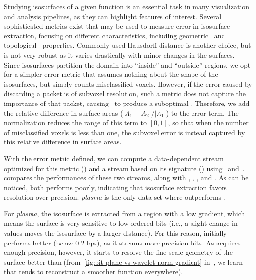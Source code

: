 Studying isosurfaces of a given function is an essential task in many visualization and analysis
pipelines, as they can highlight features of interest. Several sophisticated metrics exist that may
be used to measure error in isosurface extraction, focusing on different characteristics, including
geometric~\cite{verifiable-isosurface} and topological~\cite{topology-verification-isosurface}
properties. Commonly used Hausdorff distance is another choice, but is not very robust as it varies
drastically with minor changes in the surfaces. Since isosurfaces partition the domain into
``inside'' and ``outside'' regions, we opt for a simpler error metric that assumes nothing about the
shape of the isosurfaces, but simply counts misclassified voxels. However, if the error caused by
discarding a packet is of subvoxel resolution, such a metric does not capture the importance of that
packet, causing~ to produce a suboptimal \siop. Therefore, we add the relative
difference in surface areas ($|A_1-A_2|/|A_1|$) to the error term. The normalization reduces the
range of this term to $[0, 1]$, so that when the number of misclassified voxels is less than one,
the subvoxel error is instead captured by this relative difference in surface areas.

With the error metric defined, we can compute a data-dependent stream optimized for this metric
(\siop) and a stream based on its signature (\sisg) using~
and~.  compares the performances of these two
streams, along with \sbit, \slvl, \swav, and \smag. As can be noticed, both \slvl performs poorly,
indicating that isosurface extraction favors resolution over precision. \emph{plasma} is the only
data set where \sbit outperforms \swav.

For \emph{plasma}, the isosurface is extracted from a region with a low gradient, which means the
surface is very sensitive to low-ordered bits (i.e., a slight change in values moves the isosurface
by a larger distance). For this reason, \swav initially performs better (below 0.2 bps), as it
streams more precision bits. As \sbit acquires enough precision, however, it starts to resolve the
fine-scale geometry of the surface better than \swav
(from~\autoref{fig:bit-plane-vs-wavelet-norm-gradient} in~, we learn that \swav
tends to reconstruct a smoother function everywhere).

